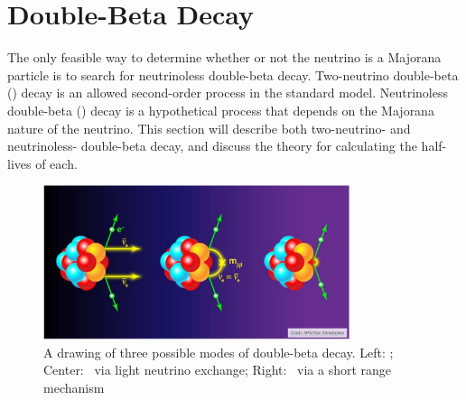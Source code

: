 \documentclass[/main.tex]{subfiles}
\begin{document}
\section{Double-Beta Decay}
The only feasible way to determine whether or not the neutrino is a Majorana particle is to search for neutrinoless double-beta decay.
Two-neutrino double-beta (\tnbb) decay is an allowed second-order process in the standard model.
Neutrinoless double-beta (\znbb) decay is a hypothetical process that depends on the Majorana nature of the neutrino.
This section will describe both two-neutrino- and neutrinoless- double-beta decay, and discuss the theory for calculating the half-lives of each.
\begin{figure}[t]
  \centering
  \includegraphics[width=0.8\textwidth]{bbdecay}
  \caption[Double-Beta Decay]{\label{fig:bbdecay}
    A drawing of three possible modes of double-beta decay. Left: \tnbb; Center: \znbb\ via light neutrino exchange; Right: \znbb\ via a short range mechanism
  }
\end{figure}
\end{document}
